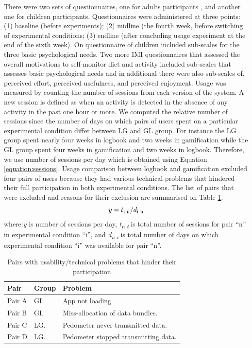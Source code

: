 \documentclass{sig-alternate}
\def\SB#1{\textsubscript{\textcolor{black}{#1}}}
\begin{document}
There were two sets of questionnaires, one for adults participants , and another one for children participants. Questionnaires were administered at three points: (1) baseline (before experiments); (2) midline (the fourth week, before switching of experimental conditions; (3) endline (after concluding usage experiment at the end of the sixth week).\newline
On questionnaire of children included sub-scales for the three basic psychological needs. Two more IMI questionnaires that assessed the overall motivations to self-monitor diet and activity included sub-scales that assesses basic psychological needs and in additional there were also sub-scales of, perceived effort, perceived usefulness, and perceived enjoyment.\newline 
Usage was measured by counting the number of sessions from each version of the system. A new session is defined as when an activity is detected in the absence of any activity in the past one hour or more. We computed the relative number of sessions since the number of days on which pairs of users spent on a particular experimental condition differ between LG and GL group. For instance the LG group spent nearly four weeks in logbook and two weeks in gamification while the GL group spent four weeks in gamification and two weeks in logbook. Therefore, we use number of sessions per day which is obtained using Equation \ref{equation:sessions}. Usage comparison between logbook and gamification excluded four pairs of users because they had various technical problems that hindered their full participation in both experimental conditions. The list of pairs that were excluded and reasons for their exclusion are summarised on Table \ref{table:usageproblems}.
\begin{equation}
\label{equation:sessions}
y=t\SB{i n}/d\SB{i n}
\end{equation}
where:\emph{y} is number of sessions per day, \emph{t\SB{n i}} is total number of sessions for pair ``n'' in experimental condition ``i'', and \emph{d\SB{n i}} is total number of days on which experimental condition ``i'' was available for pair ``n''.
\begin{table}[h!]
  \begin{center}
    \caption{Pairs with usability/technical problems that hinder their participation}
    \label{table:usageproblems}
	\begin{tabular}{|p{1cm}|p{0.8cm}|p{5cm}|}
		\hline
		Pair&Group&Problem\\
		\hline
		Pair A&GL &App not loading\\
		\hline
		Pair B&GL& Miss-allocation of data bundles.\\
		\hline
		Pair C & LG.& Pedometer never transmitted data.\\
		\hline
		Pair D & LG.& Pedometer stopped transmitting data.\\
	\hline
	\end{tabular}
  \end{center}
\end{table}
\end{document}
